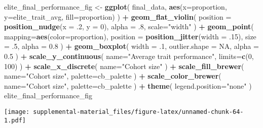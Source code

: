 \documentclass[]{book}
\newenvironment{Shaded}{\begin{snugshade}}{\end{snugshade}}
\newcommand{\DataTypeTok}[1]{\textcolor[rgb]{0.13,0.29,0.53}{#1}}
\newcommand{\DecValTok}[1]{\textcolor[rgb]{0.00,0.00,0.81}{#1}}
\newcommand{\FloatTok}[1]{\textcolor[rgb]{0.00,0.00,0.81}{#1}}
\newcommand{\KeywordTok}[1]{\textcolor[rgb]{0.13,0.29,0.53}{\textbf{#1}}}
\newcommand{\NormalTok}[1]{#1}
\newcommand{\OperatorTok}[1]{\textcolor[rgb]{0.81,0.36,0.00}{\textbf{#1}}}
\newcommand{\OtherTok}[1]{\textcolor[rgb]{0.56,0.35,0.01}{#1}}
\newcommand{\StringTok}[1]{\textcolor[rgb]{0.31,0.60,0.02}{#1}}
\begin{document}
\begin{Shaded}
\begin{Highlighting}[]
\NormalTok{elite_final_performance_fig <-}\StringTok{ }\KeywordTok{ggplot}\NormalTok{(}
\NormalTok{    final_data,}
    \KeywordTok{aes}\NormalTok{(}\DataTypeTok{x=}\NormalTok{proportion, }\DataTypeTok{y=}\NormalTok{elite_trait_avg, }\DataTypeTok{fill=}\NormalTok{proportion)}
\NormalTok{  ) }\OperatorTok{+}
\StringTok{  }\KeywordTok{geom_flat_violin}\NormalTok{(}
    \DataTypeTok{position =} \KeywordTok{position_nudge}\NormalTok{(}\DataTypeTok{x =} \FloatTok{.2}\NormalTok{, }\DataTypeTok{y =} \DecValTok{0}\NormalTok{),}
    \DataTypeTok{alpha =} \FloatTok{.8}\NormalTok{,}
    \DataTypeTok{scale=}\StringTok{"width"}
\NormalTok{  ) }\OperatorTok{+}
\StringTok{  }\KeywordTok{geom_point}\NormalTok{(}
    \DataTypeTok{mapping=}\KeywordTok{aes}\NormalTok{(}\DataTypeTok{color=}\NormalTok{proportion),}
    \DataTypeTok{position =} \KeywordTok{position_jitter}\NormalTok{(}\DataTypeTok{width =} \FloatTok{.15}\NormalTok{),}
    \DataTypeTok{size =} \FloatTok{.5}\NormalTok{,}
    \DataTypeTok{alpha =} \FloatTok{0.8}
\NormalTok{  ) }\OperatorTok{+}
\StringTok{  }\KeywordTok{geom_boxplot}\NormalTok{(}
    \DataTypeTok{width =} \FloatTok{.1}\NormalTok{,}
    \DataTypeTok{outlier.shape =} \OtherTok{NA}\NormalTok{,}
    \DataTypeTok{alpha =} \FloatTok{0.5}
\NormalTok{  ) }\OperatorTok{+}
\StringTok{  }\KeywordTok{scale_y_continuous}\NormalTok{(}
    \DataTypeTok{name=}\StringTok{"Average trait performance"}\NormalTok{,}
    \DataTypeTok{limits=}\KeywordTok{c}\NormalTok{(}\DecValTok{0}\NormalTok{, }\DecValTok{100}\NormalTok{)}
\NormalTok{  ) }\OperatorTok{+}
\StringTok{  }\KeywordTok{scale_x_discrete}\NormalTok{(}
    \DataTypeTok{name=}\StringTok{"Cohort size"}
\NormalTok{  ) }\OperatorTok{+}
\StringTok{  }\KeywordTok{scale_fill_brewer}\NormalTok{(}
    \DataTypeTok{name=}\StringTok{"Cohort size"}\NormalTok{,}
    \DataTypeTok{palette=}\NormalTok{cb_palette}
\NormalTok{  ) }\OperatorTok{+}
\StringTok{  }\KeywordTok{scale_color_brewer}\NormalTok{(}
    \DataTypeTok{name=}\StringTok{"Cohort size"}\NormalTok{,}
    \DataTypeTok{palette=}\NormalTok{cb_palette}
\NormalTok{  ) }\OperatorTok{+}
\StringTok{  }\KeywordTok{theme}\NormalTok{(}
    \DataTypeTok{legend.position=}\StringTok{"none"}
\NormalTok{  )}
\NormalTok{elite_final_performance_fig}
\end{Highlighting}
\end{Shaded}

\texttt{[image: supplemental-material\_files/figure-latex/unnamed-chunk-64-1.pdf]}
\end{document}
